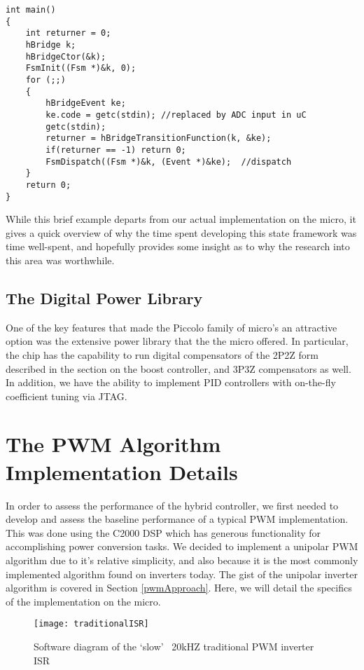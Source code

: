 \begin{lstlisting}
int main()
{
    int returner = 0;
    hBridge k;
    hBridgeCtor(&k);
    FsmInit((Fsm *)&k, 0);
    for (;;)
    {
        hBridgeEvent ke;                   
        ke.code = getc(stdin); //replaced by ADC input in uC           
        getc(stdin);                      
        returner = hBridgeTransitionFunction(k, &ke);
        if(returner == -1) return 0;
        FsmDispatch((Fsm *)&k, (Event *)&ke);  //dispatch
    }
    return 0;
}
\end{lstlisting}
\hfill \break
\hfill \break
 
While this brief example departs from our actual implementation on the micro, it gives a quick overview of why the time spent developing this state framework was time well-spent, and hopefully provides some insight as to why the research into this area was worthwhile.

\subsection{The Digital Power Library}
One of the key features that made the Piccolo family of micro's an attractive option was the extensive power library that the the micro offered. In particular, the chip has the capability to run digital compensators of the 2P2Z form described in the section on the boost controller, and 3P3Z compensators as well. In addition, we have the ability to implement PID controllers with on-the-fly coefficient tuning via JTAG.

\section{The PWM Algorithm Implementation Details}
In order to assess the performance of the hybrid controller, we first needed to develop and assess the baseline performance of a typical PWM implementation. This was done using the C2000 DSP which has generous functionality for accomplishing power conversion tasks. We decided to implement a unipolar PWM algorithm due to it's relative simplicity, and also because it is the most commonly implemented algorithm found on inverters today. The gist of the unipolar inverter algorithm is covered in Section \ref{pwmApproach}. Here, we will detail the specifics of the implementation on the micro.

\begin{figure}[h]
\begin{center}
\texttt{[image: traditionalISR]}
\caption{Software diagram of the `slow' ~20kHZ traditional PWM inverter ISR}
\label{slow}
\end{center}
\end{figure}


